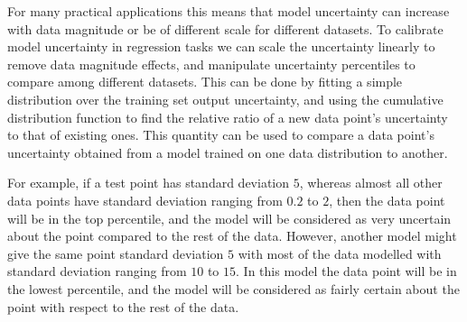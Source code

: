 \documentclass{article} %
\theoremstyle{definition}
\begin{document}
For many practical applications this means that model uncertainty can increase with data magnitude or be of different scale for different datasets. 
To calibrate model uncertainty in regression tasks we can scale the uncertainty linearly to remove data magnitude effects, and manipulate uncertainty percentiles to compare among different datasets. This can be done by fitting a simple distribution over the training set output uncertainty, and using the cumulative distribution function to find the relative ratio of a new data point's uncertainty to that of existing ones. This quantity can be used to compare a data point's uncertainty obtained from a model trained on one data distribution to another.

For example, if a test point has standard deviation $5$, whereas almost all other data points have standard deviation ranging from $0.2$ to $2$, then the data point will be in the top percentile, and the model will be considered as very uncertain about the point compared to the rest of the data. However, another model might give the same point standard deviation $5$ with most of the data modelled with standard deviation ranging from $10$ to $15$. In this model the data point will be in the lowest percentile, and the model will be considered as fairly certain about the point with respect to the rest of the data.



\end{document}
